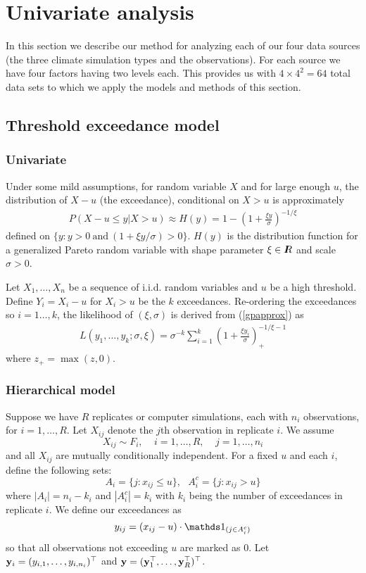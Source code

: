 \section{Univariate analysis}
\label{margin}

In this section we describe our method for analyzing each of our four data sources (the three climate simulation types and the observations). For each source we have four factors having two levels each. This provides us with $4\times 4^2=64$ total data sets to which we apply the models and methods of this section.

\subsection{Threshold exceedance model}
\label{thresh}

\subsubsection{Univariate}
\label{univariate}

Under some mild assumptions, for random variable $X$ and for large enough $u$, the distribution of $X-u$ (the exceedance), conditional on $X>u$ is approximately
\begin{align}
P(X-u\leq y|X>u) \approx H(y) = 1 - \left(1+\frac{\xi y}{\sigma}\right)^{-1/\xi} \label{gpapprox}
\end{align}
defined on $\{y:y>0~\mathrm{and}~(1+\xi y/\sigma) >0\}$. $H(y)$ is the distribution function for a generalized Pareto random variable with shape parameter $\xi\in I\hspace{-4.4pt}R$ and scale $\sigma>0$.

Let $X_1,\ldots,X_n$ be a sequence of i.i.d. random variables and $u$ be a high threshold. Define $Y_i=X_i-u$ for $X_i>u$ be the $k$ exceedances. Re-ordering the exceedances so $i=1\ldots,k$, the likelihood of $(\xi,\sigma)$ is derived from (\ref{gpapprox}) as
\begin{align}
L(y_1,\ldots,y_k;\sigma,\xi)=\sigma^{-k}\sum_{i=1}^k\left(1+\frac{\xi y_i}{\sigma}\right)_+^{-1/\xi-1} \label{gplike}
\end{align}
where $z_+=\max(z,0)$.

\subsubsection{Hierarchical model}
\label{hier}

Suppose we have $R$ replicates or computer simulations, each with $n_i$ observations, for $i=1,\ldots,R$. Let $X_{ij}$ denote the $j$th observation in replicate $i$. We assume
\[ X_{ij} \sim F_i,~~~~~i=1,\ldots,R,~~~~~j=1,\ldots,n_i \]
and all $X_{ij}$ are mutually conditionally independent. For a fixed $u$ and each $i$, define the following sets:
\[ A_i = \{j:x_{ij}\leq u\},~~~ A_i^c = \{j: x_{ij}>u\} \]
where $|A_i|=n_i-k_i$ and $|A_i^c|=k_i$ with $k_i$ being the number of exceedances in replicate $i$. We define our exceedances as
\[ y_{ij} = (x_{ij}-u)\cdot \ind_{(j \in A_i^c)} \]
so that all observations not exceeding $u$ are marked as $0$. Let $\mathbf{\bm{y}}_i=(y_{i,1},\ldots,y_{i,n_i})^\top$ and $\mathbf{\bm{y}}=(\mathbf{\bm{y}}_1^\top,\ldots,\mathbf{\bm{y}}_R^\top)^\top$.

